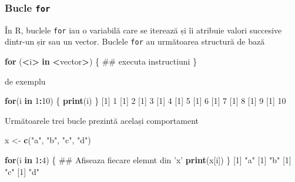 \documentclass[]{article}
\newenvironment{Shaded}{\begin{snugshade}}{\end{snugshade}}
\newcommand{\KeywordTok}[1]{\textcolor[rgb]{0.13,0.29,0.53}{\textbf{#1}}}
\newcommand{\DecValTok}[1]{\textcolor[rgb]{0.00,0.00,0.81}{#1}}
\newcommand{\StringTok}[1]{\textcolor[rgb]{0.31,0.60,0.02}{#1}}
\newcommand{\ControlFlowTok}[1]{\textcolor[rgb]{0.13,0.29,0.53}{\textbf{#1}}}
\newcommand{\OperatorTok}[1]{\textcolor[rgb]{0.81,0.36,0.00}{\textbf{#1}}}
\newcommand{\NormalTok}[1]{#1}
\newcounter{exo}[section]
\begin{document}
\subsubsection{\texorpdfstring{Bucle
\texttt{for}}{Bucle for}}\label{bucle-for}

În R, buclele \texttt{for} iau o variabilă care se iterează și îi
atribuie valori succesive dintr-un șir sau un vector. Buclele
\texttt{for} au următoarea structură de bază

\begin{Shaded}
\begin{Highlighting}[]
\ControlFlowTok{for}\NormalTok{ (}\OperatorTok{<}\NormalTok{i}\OperatorTok{>}\StringTok{ }\ControlFlowTok{in} \OperatorTok{<}\NormalTok{vector}\OperatorTok{>}\NormalTok{) \{}
\NormalTok{        ## executa instructiuni}
\NormalTok{\} }
\end{Highlighting}
\end{Shaded}

de exemplu

\begin{Shaded}
\begin{Highlighting}[]
\ControlFlowTok{for}\NormalTok{(i }\ControlFlowTok{in} \DecValTok{1}\OperatorTok{:}\DecValTok{10}\NormalTok{) \{}
        \KeywordTok{print}\NormalTok{(i)}
\NormalTok{\}}
\NormalTok{[}\DecValTok{1}\NormalTok{] }\DecValTok{1}
\NormalTok{[}\DecValTok{1}\NormalTok{] }\DecValTok{2}
\NormalTok{[}\DecValTok{1}\NormalTok{] }\DecValTok{3}
\NormalTok{[}\DecValTok{1}\NormalTok{] }\DecValTok{4}
\NormalTok{[}\DecValTok{1}\NormalTok{] }\DecValTok{5}
\NormalTok{[}\DecValTok{1}\NormalTok{] }\DecValTok{6}
\NormalTok{[}\DecValTok{1}\NormalTok{] }\DecValTok{7}
\NormalTok{[}\DecValTok{1}\NormalTok{] }\DecValTok{8}
\NormalTok{[}\DecValTok{1}\NormalTok{] }\DecValTok{9}
\NormalTok{[}\DecValTok{1}\NormalTok{] }\DecValTok{10}
\end{Highlighting}
\end{Shaded}

Următoarele trei bucle prezintă același comportament

\begin{Shaded}
\begin{Highlighting}[]
\NormalTok{x <-}\StringTok{ }\KeywordTok{c}\NormalTok{(}\StringTok{"a"}\NormalTok{, }\StringTok{"b"}\NormalTok{, }\StringTok{"c"}\NormalTok{, }\StringTok{"d"}\NormalTok{)}

\ControlFlowTok{for}\NormalTok{(i }\ControlFlowTok{in} \DecValTok{1}\OperatorTok{:}\DecValTok{4}\NormalTok{) \{}
\NormalTok{        ## Afiseaza fiecare elemnt din 'x'}
        \KeywordTok{print}\NormalTok{(x[i])  }
\NormalTok{\}}
\NormalTok{[}\DecValTok{1}\NormalTok{] }\StringTok{"a"}
\NormalTok{[}\DecValTok{1}\NormalTok{] }\StringTok{"b"}
\NormalTok{[}\DecValTok{1}\NormalTok{] }\StringTok{"c"}
\NormalTok{[}\DecValTok{1}\NormalTok{] }\StringTok{"d"}
\end{Highlighting}
\end{Shaded}
\end{document}
